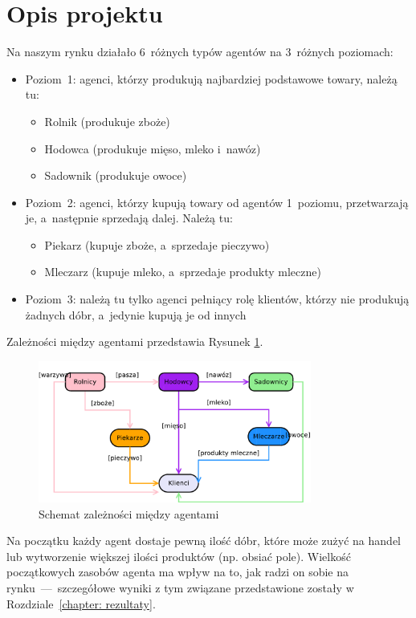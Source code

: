 \documentclass[12pt]{article}
\begin{document}
\section{Opis projektu}
Na naszym rynku działało 6~różnych typów agentów na 3~różnych poziomach:
\begin{itemize}
 \item Poziom~1: agenci, którzy produkują najbardziej podstawowe towary, należą tu:
  \begin{itemize}
  \item Rolnik (produkuje zboże)
  \item Hodowca (produkuje mięso, mleko i~nawóz)
  \item Sadownik (produkuje owoce)
  \end{itemize}
 \item Poziom~2: agenci, którzy kupują towary od agentów 1~poziomu, przetwarzają je, a~następnie sprzedają dalej. Należą tu:
  \begin{itemize}
   \item Piekarz (kupuje zboże, a~sprzedaje pieczywo)
   \item Mleczarz (kupuje mleko, a~sprzedaje produkty mleczne)
  \end{itemize}
 \item Poziom~3: należą tu tylko agenci pełniący rolę klientów, którzy nie produkują żadnych dóbr, a~jedynie kupują je od innych
\end{itemize}

Zależności między agentami przedstawia Rysunek \ref{fig:schemat zależności}.
\begin{figure} [H]
 \centering
 \includegraphics[width=0.8\textwidth]{diagram_kolorowy}
 \caption{Schemat zależności między agentami}
 \label{fig:schemat zależności}
\end{figure}

Na początku każdy agent dostaje pewną ilość dóbr, które może zużyć na handel lub wytworzenie większej ilości produktów (np. obsiać pole). Wielkość początkowych zasobów agenta ma wpływ na to, jak radzi on sobie
na rynku~---~szczegółowe wyniki z tym związane przedstawione zostały w Rozdziale~\ref{chapter: rezultaty}.
\end{document}
